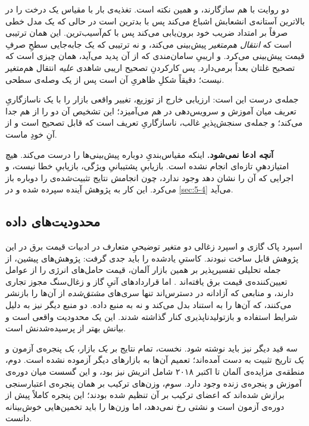 دو روایت با هم سازگارند، و همین نکته است. تغذیه‌ی بار با مقیاس  یک
درخت را در بالاترین آستانه‌ی انشعابش اشباع می‌کند  پس  با
 بدترین است  در حالی که یک مدل خطی صرفاً بر امتداد ضریب خود
برون‌یابی می‌کند  پس  با  کم‌آسیب‌ترین. این
همان ترتیبی است که \emph{انتقال هم‌متغیر} پیش‌بینی می‌کند، و نه ترتیبی که یک
جابه‌جایی سطحِ صرفِ قیمت پیش‌بینی می‌کرد. و اریبیِ سامان‌مندی که از آن پدید
می‌آید، همان چیزی است که تصحیح غلتان بعداً برمی‌دارد. پس کارکردنِ تصحیح اریبی
شاهدی \emph{علیه} انتقال هم‌متغیر نیست؛ دقیقاً شکلِ ظاهریِ آن است پس از یک
وصله‌ی سطحی.

جمله‌ی درست این است: ارزیابی خارج از توزیع، تغییر واقعی بازار را با یک
ناسازگاریِ تعریف میان آموزش و سرویس‌دهی در هم می‌آمیزد؛ این تشخیص آن دو را از هم
جدا می‌کند؛ و جمله‌ی سنجش‌پذیرِ غالب، ناسازگاریِ تعریف است  که قابل تصحیح
است و از آنِ خودِ ماست.

\textbf{آنچه ادعا نمی‌شود.} اینکه مقیاس‌بندیِ دوباره پیش‌بینی‌ها را درست می‌کند.
هیچ امتیازدهیِ تازه‌ای انجام نشده است. بازیابیِ پشتیبانیِ ویژگی، بازیابیِ خطا
نیست، و اجرایی که آن را نشان دهد وجود ندارد، چون انجامش نتایج تثبیت‌شده‌ی
 را دوباره باز می‌کرد. این کار به پژوهش آینده سپرده شده و در
\cref{sec:5-4} می‌آید.

\subsection*{محدودیت‌های داده}

اسپرد پاک گازی و اسپرد زغالی  دو متغیر توضیحیِ متعارف در ادبیات قیمت برق
 در این پژوهش قابل ساخت نبودند. کاستیِ یادشده را باید جدی گرفت: پژوهش‌های
پیشین، از جمله تحلیلی تفسیرپذیر بر همین بازار آلمان، قیمت حامل‌های انرژی را از
عوامل تعیین‌کننده‌ی قیمت برق یافته‌اند
\cite{chai_forecasting_2024, trebbien_explainable_2023}. اما قراردادهای آتیِ گاز
و زغال‌سنگ مجوز تجاری دارند، و منابعی که آزادانه در دسترس‌اند تنها سری‌های \emph{مشتق‌شده} از
آن‌ها را بازنشر می‌کنند، که آن‌ها را به استناد بدل می‌کند و نه به منبع داده. دو
منبع دیگر نیز به دلیل شرایط استفاده و بازتولیدناپذیری کنار گذاشته شدند. این یک
محدودیت واقعی است و بیانش بهتر از پرسیده‌شدنش است.

سه قید دیگر نیز باید نوشته شود. نخست، تمام نتایج بر \emph{یک} بازار، \emph{یک}
پنجره‌ی آزمون و \emph{یک} تاریخ تثبیت به دست آمده‌اند؛ تعمیم آن‌ها به بازارهای
دیگر آزموده نشده است. دوم، منطقه‌ی مزایده‌ی آلمان تا اکتبر ۲۰۱۸ شامل اتریش نیز
بود، و این گسست میان دوره‌ی آموزش و پنجره‌ی زنده وجود دارد. سوم، وزن‌های ترکیب بر
همان پنجره‌ی اعتبارسنجی برازش شده‌اند که اعضای ترکیب بر آن تنظیم شده بودند؛ این
پنجره کاملاً پیش از دوره‌ی آزمون است و نشتی رخ نمی‌دهد، اما وزن‌ها را باید
تخمین‌هایی خوش‌بینانه دانست.

